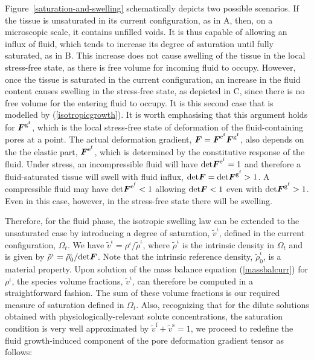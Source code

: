 Figure~\ref{saturation-and-swelling} schematically depicts two
possible scenarios. If the tissue is unsaturated in its current
configuration, as in A, then, on a microscopic scale, it contains
unfilled voids. It is thus capable of allowing an influx of fluid,
which tends to increase its degree of saturation until fully
saturated, as in B. This increase does not cause swelling of the
tissue in the local stress-free state, as there is free volume for
incoming fluid to occupy. However, once the tissue is saturated in the
current configuration, an increase in the fluid content causes
swelling in the stress-free state, as depicted in C, since there is no
free volume for the entering fluid to occupy. It is this second case
that is modelled by (\ref{isotropicgrowth}). It is worth emphasising
that this argument holds for $\mbox{\boldmath$ F$}^{\mathrm{g}^\mathrm{f}}$, which is
the local stress-free state of deformation of the fluid-containing
pores at a point. The actual deformation gradient, $\mbox{\boldmath$ F$} =
\mbox{\boldmath$ F$}^{\mathrm{e}^\mathrm{f}}\mbox{\boldmath$ F$}^{\mathrm{g}^\mathrm{f}}$, also depends
on the the elastic part, $\mbox{\boldmath$ F$}^{\mathrm{e}^\mathrm{f}}$, which is
determined by the constitutive response of the fluid. Under stress, an
incompressible fluid will have
$\mathrm{det}\mbox{\boldmath$ F$}^{\mathrm{e}^\mathrm{f}} = 1$ and therefore a
fluid-saturated tissue will swell with fluid influx, $\mathrm{det}\mbox{\boldmath$ F$}
= \mathrm{det}\mbox{\boldmath$ F$}^{\mathrm{g}^\mathrm{f}} > 1$. A compressible fluid
may have $\mathrm{det}\mbox{\boldmath$ F$}^{\mathrm{e}^\mathrm{f}} < 1$ allowing
$\mathrm{det}\mbox{\boldmath$ F$} < 1$ even with
$\mathrm{det}\mbox{\boldmath$ F$}^{\mathrm{g}^\mathrm{f}} >1$. Even in this case,
however, in the stress-free state there will be swelling.

Therefore, for the fluid phase, the isotropic swelling law can be
extended to the unsaturated case by introducing a degree of
saturation, $\tilde{v}^\iota$, defined in the current configuration,
$\Omega_t$. We have $\tilde{v}^\iota = \rho^\iota/\tilde{\rho}^\iota$,
where $\tilde{\rho}^\iota$ is the intrinsic density in $\Omega_t$ and
is given by $\tilde{\rho}^\iota =
\tilde{\rho}^\iota_0/\mathrm{det}\mbox{\boldmath$ F$}$. Note that the intrinsic
reference density, $\tilde{\rho}^\iota_0$, is a material
property. Upon solution of the mass balance equation
(\ref{massbalcurr}) for $\rho^\iota$, the species volume fractions,
$\tilde{v}^\iota$, can therefore be computed in a straightforward
fashion. The sum of these volume fractions is our required measure of
saturation defined in $\Omega_t$. Also, recognizing that for the
dilute solutions obtained with physiologically-relevant solute
concentrations, the saturation condition is very well approximated by
$\tilde{v}^\mathrm{f} + \tilde{v}^\mathrm{s} = 1$, we proceed to
redefine the fluid growth-induced component of the pore deformation
gradient tensor as follows:

